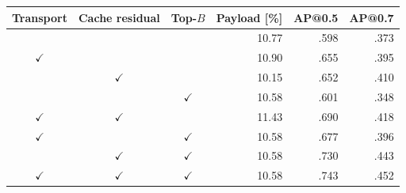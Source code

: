 \begin{tabular}{ccc rrr}
\toprule
Transport & Cache residual & Top-$B$ & Payload [\%] & AP@0.5 & AP@0.7\\
\midrule
 &  &  & 10.77 & .598 & .373\\
$\checkmark$ &  &  & 10.90 & .655 & .395\\
 & $\checkmark$ &  & 10.15 & .652 & .410\\
 &  & $\checkmark$ & 10.58 & .601 & .348\\
$\checkmark$ & $\checkmark$ &  & 11.43 & .690 & .418\\
$\checkmark$ &  & $\checkmark$ & 10.58 & .677 & .396\\
 & $\checkmark$ & $\checkmark$ & 10.58 & .730 & .443\\
$\checkmark$ & $\checkmark$ & $\checkmark$ & 10.58 & .743 & .452\\
\bottomrule
\end{tabular}
